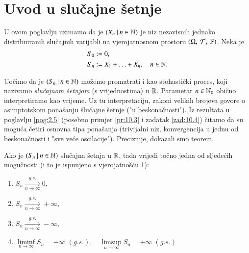 
\chapter{Uvod u slu\v cajne \v setnje}

U ovom poglavlju uzimamo da je $({X_n} \: | \: {n \in \mathbb{N}})$ je niz nezavisnih jednako distribuiranih slu\v cajnih varijabli na vjerojatnosnom prostoru $(\Omega, \: \mathcal{F}, \: \mathbb{P})$.
Neka je
\begin{equation*}
    \begin{aligned}
        S_0 &:= 0,\\
        S_n &:= X_1 + \ldots + X_n, \quad n \in \mathbb{N}.
    \end{aligned}
\end{equation*}

Uo\v cimo da je $({S_n} \: | \: {n \in \mathbb{N}})$ mo\v zemo promatrati i kao stohasti\v cki proces, koji nazivamo \emph{slu\v cajnom \v setnjom} (s vrijednostima) u $\mathbb{R}$.
Parametar $n \in \mathbb{N}_0$ obi\v cno interpretiramo kao vrijeme.
Uz tu interpretaciju, zakoni velikih brojeva govore o asimptotskom pona\v sanju \v slu\v cajne \v setnje ("u beskona\v cnosti").
Iz rezultata u poglavlju \ref{pog:2.5} (posebno primjer \ref{pr:10.3} i zadatak \ref{zad:10.4}) \v citamo da su mogu\' ca \v cetiri osnovna tipa pona\v sanja (trivijalni niz, konvergencija u jednu od beskona\v cnosti i "sve ve\' ce oscilacije").
Preciznije, dokazali smo teorem.

\begin{tm}  \label{tm:15.1}
    Ako je $({S_n} \: | \: {n \in \mathbb{N}})$ slu\v cajna \v setnja u $\mathbb{R}$, tada vrijedi to\v cno jedna od sljede\' cih mogu\v cnosti (i to je ispunjeno s vjerojatno\v s\' cu 1):
    \begin{enumerate}[label=(\roman*)]
        \item \label{tm:15.1.1}
        $S_n \xrightarrow[n \to \infty]{g.s.} 0,$
        \item \label{tm:15.1.2}
        $S_n \xrightarrow[n \to \infty]{g.s.} +\infty,$
        \item \label{tm:15.1.3}
        $S_n \xrightarrow[n \to \infty]{g.s.} -\infty,$
        \item \label{tm:15.1.4}
        $\liminf\limits_{n \to \infty} S_n = - \infty \; (g.s.), \quad \limsup\limits_{n \to \infty} S_n = + \infty \; (g.s.)$
    \end{enumerate}
\end{tm}

